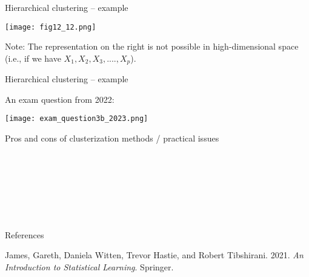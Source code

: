 \documentclass[
  10pt,
  ignorenonframetext,
]{beamer}
\newlength{\cslhangindent}
\newlength{\cslentryspacingunit} %
\newenvironment{CSLReferences}[2] %
 {%
  \setlength{\parindent}{0pt}
  \ifodd #1
  \let\oldpar\par
  \def\par{\hangindent=\cslhangindent\oldpar}
  \fi
  \setlength{\parskip}{#2\cslentryspacingunit}
 }%
 {}
\begin{document}
\begin{frame}
\begin{block}{Hierarchical clustering -- example}
\protect\hypertarget{hierarchical-clustering-example}{}
\(~\)

\texttt{[image: fig12\_12.png]}

Note: The representation on the right is not possible in
high-dimensional space (i.e., if we have \(X_1, X_2, X_3, ...., X_p\)).
\end{block}
\end{frame}

\begin{frame}
\begin{block}{Hierarchical clustering -- example}
\protect\hypertarget{hierarchical-clustering-example-1}{}
\(~\)

An exam question from 2022:

\texttt{[image: exam\_question3b\_2023.png]}
\end{block}
\end{frame}

\begin{frame}
\begin{block}{Pros and cons of clusterization methods / practical
issues}
\protect\hypertarget{pros-and-cons-of-clusterization-methods-practical-issues}{}
\(~\)

\(~\)

\(~\)

\(~\)

\(~\)

\(~\)

\(~\)

\(~\)

\(~\)

\(~\)
\end{block}
\end{frame}

\begin{frame}{References}
\protect\hypertarget{references}{}
\hypertarget{refs}{}
\begin{CSLReferences}{1}{0}
\leavevmode{}%
James, Gareth, Daniela Witten, Trevor Hastie, and Robert Tibshirani.
2021. \emph{An Introduction to Statistical Learning}. Springer.

\end{CSLReferences}
\end{frame}
\end{document}
